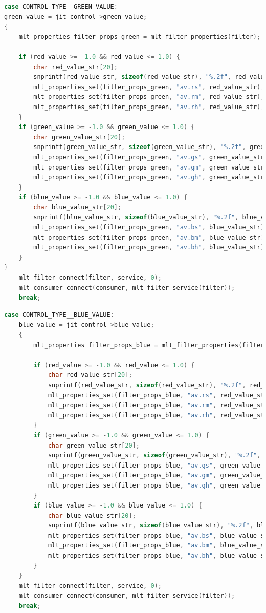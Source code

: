 \documentclass[../MasterThesis.tex]{subfiles}
\begin{document}
\begin{lstlisting}[language=c, numbers=none, columns=fullflexible]
case CONTROL_TYPE__GREEN_VALUE:
green_value = jit_control->green_value;
{
	mlt_properties filter_props_green = mlt_filter_properties(filter);
	
	if (red_value >= -1.0 && red_value <= 1.0) {
		char red_value_str[20]; 
		snprintf(red_value_str, sizeof(red_value_str), "%.2f", red_value);
		mlt_properties_set(filter_props_green, "av.rs", red_value_str);
		mlt_properties_set(filter_props_green, "av.rm", red_value_str);
		mlt_properties_set(filter_props_green, "av.rh", red_value_str);
	}	
	if (green_value >= -1.0 && green_value <= 1.0) {
		char green_value_str[20]; 
		snprintf(green_value_str, sizeof(green_value_str), "%.2f", green_value);
		mlt_properties_set(filter_props_green, "av.gs", green_value_str);
		mlt_properties_set(filter_props_green, "av.gm", green_value_str);
		mlt_properties_set(filter_props_green, "av.gh", green_value_str);
	}		
	if (blue_value >= -1.0 && blue_value <= 1.0) {
		char blue_value_str[20]; 
		snprintf(blue_value_str, sizeof(blue_value_str), "%.2f", blue_value);
		mlt_properties_set(filter_props_green, "av.bs", blue_value_str);
		mlt_properties_set(filter_props_green, "av.bm", blue_value_str);
		mlt_properties_set(filter_props_green, "av.bh", blue_value_str);
	}		
}	
	mlt_filter_connect(filter, service, 0);
	mlt_consumer_connect(consumer, mlt_filter_service(filter));
	break;

\end{lstlisting}


\begin{lstlisting}[language=c, numbers=none, columns=fullflexible]	
case CONTROL_TYPE__BLUE_VALUE:
	blue_value = jit_control->blue_value;
	{
		mlt_properties filter_props_blue = mlt_filter_properties(filter);
		
		if (red_value >= -1.0 && red_value <= 1.0) {
			char red_value_str[20]; 
			snprintf(red_value_str, sizeof(red_value_str), "%.2f", red_value);
			mlt_properties_set(filter_props_blue, "av.rs", red_value_str);
			mlt_properties_set(filter_props_blue, "av.rm", red_value_str);
			mlt_properties_set(filter_props_blue, "av.rh", red_value_str);
		}	
		if (green_value >= -1.0 && green_value <= 1.0) {
			char green_value_str[20]; 
			snprintf(green_value_str, sizeof(green_value_str), "%.2f", green_value);
			mlt_properties_set(filter_props_blue, "av.gs", green_value_str);
			mlt_properties_set(filter_props_blue, "av.gm", green_value_str);
			mlt_properties_set(filter_props_blue, "av.gh", green_value_str);
		}	
		if (blue_value >= -1.0 && blue_value <= 1.0) {
			char blue_value_str[20]; 
			snprintf(blue_value_str, sizeof(blue_value_str), "%.2f", blue_value);
			mlt_properties_set(filter_props_blue, "av.bs", blue_value_str);
			mlt_properties_set(filter_props_blue, "av.bm", blue_value_str);
			mlt_properties_set(filter_props_blue, "av.bh", blue_value_str);
		}	
	}
	mlt_filter_connect(filter, service, 0);
	mlt_consumer_connect(consumer, mlt_filter_service(filter));
	break;  

\end{lstlisting}



	
	
	
\end{document}
